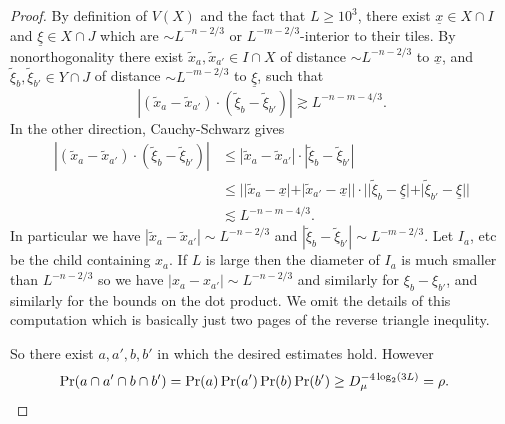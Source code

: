 \documentclass[reqno,12pt]{amsart}
\theoremstyle{definition}
\numberwithin{equation}{section}
\begin{document}
\begin{proof}
By definition of $V(X)$ and the fact that $L \geq 10^3$, there exist $\underline x \in X \cap I$ and $\underline \xi \in X \cap J$ which are $\sim L^{-n-2/3}$ or $L^{-m-2/3}$-interior to their tiles.
By nonorthogonality there exist $\tilde x_a, \tilde x_{a'} \in I \cap X$ of distance $\sim L^{-n-2/3}$ to $\underline x$, and $\tilde \xi_b, \tilde \xi_{b'} \in Y \cap J$ of distance $\sim L^{-m-2/3}$ to $\underline \xi$, such that 
$$|(\tilde x_a - \tilde x_{a'}) \cdot (\tilde \xi_b - \tilde \xi_{b'})| \gtrsim L^{-n-m-4/3}.$$
In the other direction, Cauchy-Schwarz gives 
\begin{align*}
    |(\tilde x_a - \tilde x_{a'}) \cdot (\tilde \xi_b - \tilde \xi_{b'})|
    &\leq |\tilde x_a - \tilde x_{a'}| \cdot |\tilde \xi_b - \tilde \xi_{b'}| \\
    &\leq ||\tilde x_a - \underline x| + |\tilde x_{a'} - \underline x|| \cdot ||\tilde \xi_b - \underline \xi| + |\tilde \xi_{b'} - \underline \xi|| \\
    &\lesssim L^{-n-m-4/3}.
\end{align*}
In particular we have $|\tilde x_a - \tilde x_{a'}| \sim L^{-n-2/3}$ and $|\tilde \xi_b - \tilde \xi_{b'}| \sim L^{-m-2/3}$.
Let $I_a$, etc be the child containing $x_a$.
If $L$ is large then the diameter of $I_a$ is much smaller than $L^{-n-2/3}$ so we have $|x_a - x_{a'}| \sim L^{-n-2/3}$ and similarly for $\xi_b - \xi_{b'}$, and similarly for the bounds on the dot product. We omit the details of this computation which is basically just two pages of the reverse triangle inequlity.

So there exist $a, a', b, b'$ in which the desired estimates hold.
However 
\begin{align*}
    \Pr(a \cap a' \cap b \cap b') &= \Pr(a) \Pr(a') \Pr(b) \Pr(b') \geq D_\mu^{-4\log_2(3L)} = \rho. \qedhere 
\end{align*}
\end{proof}
\end{document}
